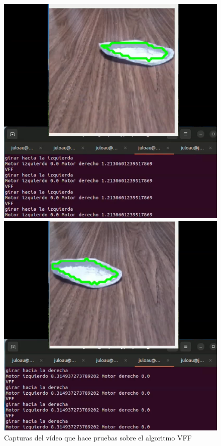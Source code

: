  
\begin{figure} [h!]
	\centering
	\begin{minipage}{0.45\linewidth}
		\centering
		\includegraphics[width=\linewidth]{figs/cap7/demovff1.png}
	\end{minipage}
	\hspace{1cm}
	\begin{minipage}{0.45\linewidth}
		\centering
		\includegraphics[width=\linewidth]{figs/cap7/demovff2.png}
	\end{minipage}
	\caption{Capturas del vídeo que hace pruebas sobre el algoritmo VFF}
	\label{fig:expvff}
\end{figure}

